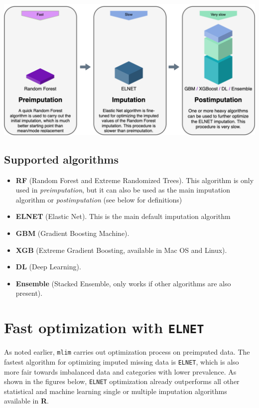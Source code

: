 \vspace{10pt}

\includegraphics[scale=0.35]{figures/procedure3.png}

\subsection{Supported algorithms}

\begin{itemize}
    
    \item \textbf{\color{violet}RF} (Random Forest and Extreme Randomized Trees). This algorithm is only used in \textit{preimputation}, but it can also be used as the main imputation algorithm or \textit{postimputation} (see below for definitions)
    
    \item \textbf{\color{blue}ELNET} (Elastic Net). This is the main default imputation algorithm
    
    \item \textbf{\color{teal}GBM} (Gradient Boosting Machine).  
    \item \textbf{\color{teal}XGB} (Extreme Gradient Boosting, available in Mac OS and Linux).
    \item \textbf{\color{teal}DL} (Deep Learning).
    \item \textbf{\color{teal}Ensemble} (Stacked Ensemble, only works if other algorithms are also present).
\end{itemize}




\section{Fast optimization with \texttt{ELNET}}

As noted earlier, \texttt{mlim} carries out optimization process on preimputed data. The fastest algorithm for optimizing imputed missing data is \texttt{ELNET}, which is also more fair towards imbalanced data and categories with lower prevalence. As shown in the figures below, \texttt{ELNET} optimization already outperforms all other statistical and machine learning single or multiple imputation algorithms available in \textbf{R}. 

